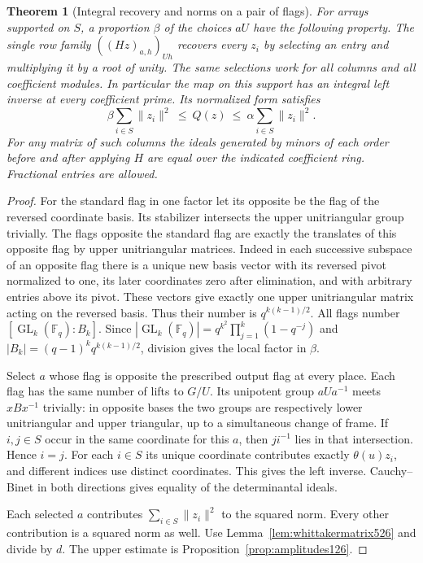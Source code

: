 \documentclass[a4paper,11pt]{article}
\newtheorem{theorem}[proposition]{Theorem}
\theoremstyle{definition}
\theoremstyle{remark}
\numberwithin{equation}{section}
\newcommand{\GL}{\operatorname{GL}}
\begin{document}
\begin{theorem}[Integral recovery and norms on a pair of flags]
\leavevmode\label{thm:flagrecovery526}
For arrays supported on \(S\), a proportion \(\beta\) of the
choices \(aU\) have the following property. The single row family
\(((Hz)_{a,h})_{Uh}\) recovers every \(z_i\) by selecting an entry and
multiplying it by a root of unity. The same selections work for
all columns and all coefficient modules. In particular the map on
this support has an integral left inverse at every coefficient prime.
Its normalized form satisfies
\[
           \beta\sum_{i\in S}\|z_i\|^2
                   \ \le\ Q(z)\ \le\ \alpha\sum_{i\in S}\|z_i\|^2 .
\]
For any matrix of such columns the ideals generated by minors of
each order before and after applying \(H\) are equal over the indicated
coefficient ring. Fractional entries are allowed.
\end{theorem}
\begin{proof}
For the standard flag in one factor let its opposite be the flag
of the reversed coordinate basis. Its stabilizer intersects the
upper unitriangular group trivially. The flags opposite the standard
flag are exactly the translates of this opposite flag by upper
unitriangular matrices. Indeed in each successive subspace of an
opposite flag there is a unique new basis vector with its reversed
pivot normalized to one, its later coordinates zero after elimination,
and with arbitrary entries above its pivot. These vectors give
exactly one upper unitriangular matrix acting on the reversed
basis. Thus their number is \(q^{k(k-1)/2}\).
All flags number \([\GL_k(\mathbb F_q):B_k]\).
Since \(|\GL_k(\mathbb F_q)|=q^{k^2}\prod_{j=1}^k(1-q^{-j})\)
and \(|B_k|=(q-1)^k q^{k(k-1)/2}\), division gives the
local factor in \(\beta\).

Select \(a\) whose flag is opposite the prescribed output flag at
every place. Each flag has the same number of lifts to \(G/U\).
Its unipotent group \(aUa^{-1}\) meets \(xBx^{-1}\) trivially:
in opposite bases the two groups are respectively lower unitriangular
and upper triangular, up to a simultaneous change of frame.
If \(i,j\in S\) occur in the same coordinate for this \(a\), then
\(ji^{-1}\) lies in that intersection. Hence \(i=j\).
For each \(i\in S\) its unique coordinate contributes exactly
\(\theta(u)z_i\), and different indices use distinct coordinates.
This gives the left inverse. Cauchy--Binet in both directions
gives equality of the determinantal ideals.

Each selected \(a\) contributes \(\sum_{i\in S}\|z_i\|^2\) to the
squared norm. Every other contribution is a squared norm as well.
Use Lemma~\ref{lem:whittakermatrix526} and divide by \(d\).
The upper estimate is Proposition~\ref{prop:amplitudes126}.
\end{proof}
\end{document}

